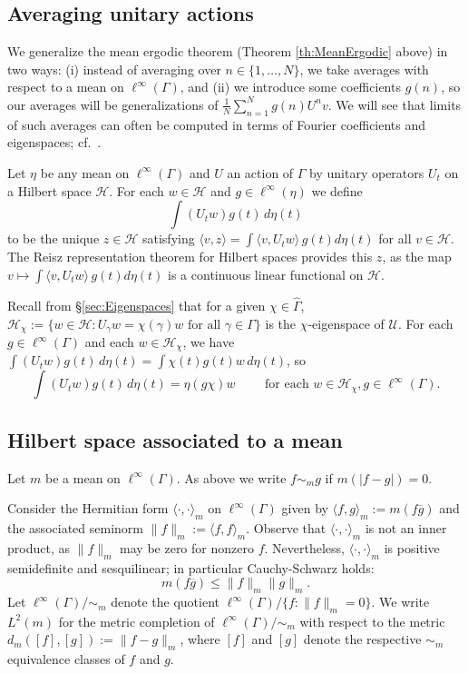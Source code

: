 \documentclass[12pt]{amsart} \usepackage{amsmath,centernot,amssymb,leftindex}
\numberwithin{theorem}{section}
\numberwithin{equation}{section}
\theoremstyle{definition}
\begin{document}
	\subsection{Averaging unitary actions} \label{sec:DefE}  We generalize the mean ergodic theorem (Theorem \ref{th:MeanErgodic} above) in two ways: (i) instead of averaging over $n\in \{1,\dots,N\}$, we take averages with respect to a mean on $\ell^\infty(\Gamma)$, and (ii) we introduce some coefficients $g(n)$, so our averages will be generalizations of $\frac{1}{N}\sum_{n=1}^N g(n)U^n v$.  We will see that limits of such averages can often be computed in terms of Fourier coefficients and eigenspaces; cf.~\cite{JonesRosenblattTempelman_Ergodic}.
	
	 Let $\eta$ be any mean on $\ell^{\infty}(\Gamma)$ and  $U$ an action of $\Gamma$ by unitary operators $U_t$ on a Hilbert space $\mathcal H$. For each $w\in \mathcal H$ and $g\in \ell^{\infty}(\eta)$ we define \[\int (U_{t} w)g(t)\, d\eta(t)\] to be the unique $z\in \mathcal H$ satisfying $\langle v, z\rangle = \int \langle v, U_t w\rangle\, g(t) d\eta(t)$ for all $v\in \mathcal H$. The Reisz representation theorem for Hilbert spaces provides this $z$, as the map $v\mapsto \int \langle v, U_t w\rangle\, g(t) d\eta(t)$ is a continuous linear functional on $\mathcal H$.
	
	Recall from \S\ref{sec:Eigenspaces} that for a given $\chi\in \widehat{\Gamma}$, $\mathcal H_\chi:=\{w\in \mathcal H:U_{\gamma}w= \chi(\gamma)w \text{ for all } \gamma\in \Gamma\}$ is the $\chi$-eigenspace of $\mathcal U$.
For each $g\in \ell^{\infty}(\Gamma)$ and each $w\in \mathcal H_{\chi}$, we have $\int (U_{t} w) g(t)\, d\eta(t)=\int  \chi(t)g(t)w \, d\eta(t)$, so 
	\begin{equation}\label{eq:EigenMean}\int (U_{t}w)g(t)\,d\eta(t) = \eta(g\chi)w \qquad \text{ for each } w\in \mathcal H_{\chi}, g\in \ell^{\infty}(\Gamma).
	\end{equation}
	
	
	\subsection{Hilbert space associated to a mean} Let $m$ be a mean on $\ell^{\infty}(\Gamma)$. As above we write $f\sim_m g$ if $m(|f-g|)=0$.  
	
	Consider the Hermitian form $\langle \cdot , \cdot \rangle_m$ on $\ell^\infty(\Gamma)$ given by $\langle f,g\rangle_m:=m(f\overline{g})$ and the associated seminorm $\|f\|_{m}:=\langle f,f\rangle_m$.  Observe that $\langle \cdot , \cdot \rangle_m$ is not an inner product, as $\|f\|_m$ may be zero for nonzero $f$.  Nevertheless, $\langle \cdot, \cdot\rangle_m$ is positive semidefinite and sesquilinear; in particular Cauchy-Schwarz holds:
	\begin{equation}\label{eq:CS}
		m(f\overline{g})\leq \|f\|_{m}\|g\|_{m}.
	\end{equation} Let $\ell^{\infty}(\Gamma)/\sim_{m}$ denote the quotient $\ell^\infty(\Gamma)/\{f:\|f\|_m=0\}$.  We write $L^2(m)$ for the metric completion of $\ell^\infty(\Gamma)/\sim_{m}$ with respect to the metric $d_m([f],[g]):=\|f-g\|_m$, where $[f]$ and $[g]$ denote the respective $\sim_{m}$ equivalence classes of $f$ and $g$. 
\end{document}
